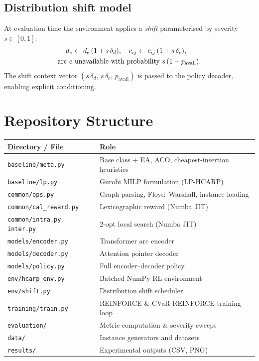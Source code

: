 \documentclass[11pt,a4paper]{article}
\begin{document}
\subsection{Distribution shift model}

At evaluation time the environment applies a \emph{shift} parameterised by
severity $s \in [0,1]$:
\begin{align}
  d_e &\leftarrow d_e\,(1+s\,\delta_d),\quad
  c_{ij} \leftarrow c_{ij}\,(1+s\,\delta_c), \notag\\
  \text{arc } e &\text{ unavailable with probability } s\,(1-p_\text{avail}).
\end{align}
The shift context vector $(s\,\delta_d,\, s\,\delta_c,\, p_\text{avail})$ is
passed to the policy decoder, enabling explicit conditioning.

\section{Repository Structure}

\begin{center}
\begin{tabular}{ll}
\toprule
\textbf{Directory / File} & \textbf{Role} \\
\midrule
\texttt{baseline/meta.py} & Base class + EA, ACO, cheapest-insertion heuristics \\
\texttt{baseline/lp.py}   & Gurobi MILP formulation (LP-HCARP) \\
\texttt{common/ops.py}    & Graph parsing, Floyd--Warshall, instance loading \\
\texttt{common/cal\_reward.py} & Lexicographic reward (Numba JIT) \\
\texttt{common/intra.py}, \texttt{inter.py} & 2-opt local search (Numba JIT) \\
\texttt{models/encoder.py} & Transformer arc encoder \\
\texttt{models/decoder.py} & Attention pointer decoder \\
\texttt{models/policy.py} & Full encoder--decoder policy \\
\texttt{env/hcarp\_env.py} & Batched NumPy RL environment \\
\texttt{env/shift.py}      & Distribution shift scheduler \\
\texttt{training/train.py} & REINFORCE \& CVaR-REINFORCE training loop \\
\texttt{evaluation/}       & Metric computation \& severity sweeps \\
\texttt{data/}             & Instance generators and datasets \\
\texttt{results/}          & Experimental outputs (CSV, PNG) \\
\bottomrule
\end{tabular}
\end{center}
\end{document}
